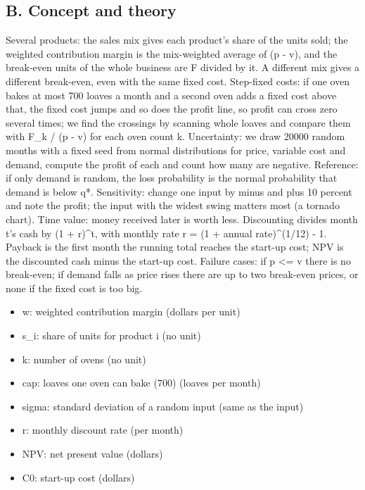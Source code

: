 \documentclass[11pt,a4paper]{article}
\begin{document}
\subsection*{B. Concept and theory}
Several products: the sales mix gives each product's share of the units sold; the weighted contribution margin is the mix-weighted average of (p - v), and the break-even units of the whole business are F divided by it. A different mix gives a different break-even, even with the same fixed cost. Step-fixed costs: if one oven bakes at most 700 loaves a month and a second oven adds a fixed cost above that, the fixed cost jumps and so does the profit line, so profit can cross zero several times; we find the crossings by scanning whole loaves and compare them with F\_k / (p - v) for each oven count k. Uncertainty: we draw 20000 random months with a fixed seed from normal distributions for price, variable cost and demand, compute the profit of each and count how many are negative. Reference: if only demand is random, the loss probability is the normal probability that demand is below q*. Sensitivity: change one input by minus and plus 10 percent and note the profit; the input with the widest swing matters most (a tornado chart). Time value: money received later is worth less. Discounting divides month t's cash by (1 + r)\textasciicircum{}t, with monthly rate r = (1 + annual rate)\textasciicircum{}(1/12) - 1. Payback is the first month the running total reaches the start-up cost; NPV is the discounted cash minus the start-up cost. Failure cases: if p \textless{}= v there is no break-even; if demand falls as price rises there are up to two break-even prices, or none if the fixed cost is too big.

\begin{itemize}[nosep]
\item w: weighted contribution margin (dollars per unit)
\item s\_i: share of units for product i (no unit)
\item k: number of ovens (no unit)
\item cap: loaves one oven can bake (700) (loaves per month)
\item sigma: standard deviation of a random input (same as the input)
\item r: monthly discount rate (per month)
\item NPV: net present value (dollars)
\item C0: start-up cost (dollars)
\end{itemize}
\end{document}
